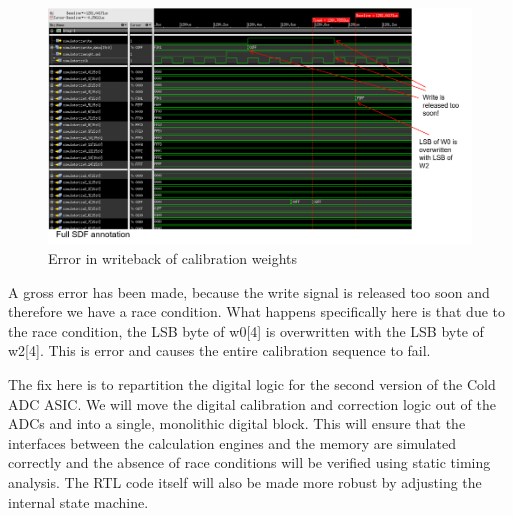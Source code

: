 \begin{figure}[htb]
\centering
\begin{center}
\includegraphics[width=1.0\textwidth]{figures/ErrorCalWrite.png}
\end{center}
\caption{Error in writeback of calibration weights}
\label{fig:errorcalwrite}
\end{figure}


A gross error has been made, because the write signal is released too soon and therefore we have a race condition. What happens specifically here is that due to the race condition, the LSB byte of w0[4] is overwritten with the LSB byte of w2[4]. This is error and causes the entire calibration sequence to fail.

The fix here is to repartition the digital logic for the second version of the Cold ADC ASIC. We will move the digital calibration and correction logic out of the ADCs and into a single, monolithic digital block. This will ensure that the interfaces between the calculation engines and the memory are simulated correctly and the absence of race conditions will be verified using static timing analysis. The RTL code itself will also be made more robust by adjusting the internal state machine.

